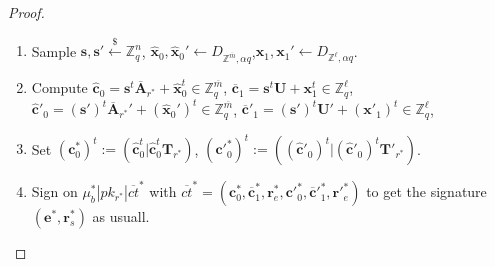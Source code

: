 \documentclass[a4paper,11pt,onecolumn]{elsarticle}
\begin{document}
\begin{proof}
\begin{description}
\begin{enumerate}
		\item Sample $\textbf{s}, \textbf{s}' \xleftarrow{\$} \mathbb{Z}_q^{n}$, \quad  $\hat{\textbf{x}}_0, \hat{\textbf{x}}_0'\leftarrow D_{\mathbb{Z}^{\overline{m}}, \alpha q}$,\quad  $\textbf{x}_1, \textbf{x}_1'\leftarrow D_{\mathbb{Z}^{\ell}, \alpha q}$.
			  	\item Compute $\hat{\textbf{c}}_0=\textbf{s}^t\overline{\mathbf{A}}_{r^*}+\hat{\textbf{x}}_0^t \in \mathbb{Z}_q^{\overline{m}}$, $\overline{\textbf{c}}_1=\textbf{s}^t\textbf{U}+ \textbf{x}^t_1 \in \mathbb{Z}_q^{\ell}$,
			 	$\hat{\textbf{c}}'_0=(\textbf{s}')^t\overline{\mathbf{A}}_{r^*}'+(\hat{\textbf{x}}_0')^t \in \mathbb{Z}_q^{\overline{m}}$, $\overline{\textbf{c}}'_1=(\textbf{s}')^t\textbf{U}'+ (\textbf{x}'_1)^t \in \mathbb{Z}_q^{\ell}$,
		\item Set  ${(\textbf{c}^*_0)}^t:=(\hat{\textbf{c}}_0^t|\hat{\textbf{c}}_0^t\textbf{T}_{r^*})$, \quad  ${(\textbf{c}'^*_0)}^t:=((\hat{\textbf{c}}'_0)^t|(\hat{\textbf{c}}'_0)^t\textbf{T}'_{r^*})$.
	
		\item Sign on $\mu^*_b| pk_{r^*}|\overline{ct}^*$ with $\overline{ct}^*=(\textbf{c}^*_0, \overline{\textbf{c}}^*_1, \textbf{r}^*_e, \textbf{c}'^*_0, \overline{\textbf{c}}'^*_1, \textbf{r}'^*_e)$ to get the signature $(\textbf{e}^*, \textbf{r}_s^*)$ as usuall. 
		

\end{enumerate}
\end{description}
\end{proof}
\end{document}
